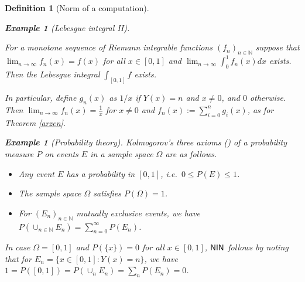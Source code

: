 \documentclass[reqno]{amsart}
\newtheorem{defi}[thm]{Definition}
\newtheorem{exa}[thm]{Example}
\def\N{{\mathbb  N}}
\def\di{\rightarrow}
\def\NIN{\textup{\textsf{NIN}}}
\numberwithin{equation}{section}
\numberwithin{thm}{section}
\begin{document}
\begin{defi}[Norm of a computation]
\begin{exa}[Lebesgue integral II]
\begin{center}
\emph{For a monotone sequence of Riemann integrable functions $(f_{n})_{n\in \N}$ suppose that $\lim_{n\di \infty}f_{n}(x)=f(x)$ for all $x\in [0,1]$ and $\lim_{n\di \infty} \int_{0}^{1}f_{n}(x)dx$ exists.  Then the Lebesgue integral $\int_{[0,1]}f$ exists.}
\end{center}
In particular, define $g_{n}(x)$ as $1/x$ if $Y(x)=n$ and $x\ne 0$, and $0$ otherwise.  Then $\lim_{n\di \infty} f_{n}(x)=\frac{1}{x}$ for $x\ne 0$ and $f_{n}(x):=\sum_{i=0}^{n}g_{i}(x)$, as for Theorem \ref{arzen}.
\end{exa}
\begin{exa}[Probability theory]\rm
Kolmogorov's three axioms (\cite{kolliek}) of a probability measure $P$ on events $E$ in a sample space $\Omega$ are as follows.
\begin{itemize} 
\item Any event $E$ has a probability in $[0,1]$, i.e.\ $0\leq P(E)\leq 1$.
\item The sample space $\Omega$ satisfies $P(\Omega)=1$. 
\item For $(E_{n})_{n\in \N}$ mutually exclusive events, we have $P(\cup_{n\in \N}E_{n})=\sum_{n=0}^{\infty}P(E_{n})$.
\end{itemize}
In case $\Omega=[0,1]$ and $P(\{x\})=0$ for all $x\in [0,1]$, $\NIN$ follows by noting that for $E_{n}=\{x\in [0,1]:Y(x)=n\}$, we have $1=P([0,1])=P(\cup_{n}E_{n})=\sum_{n}P(E_{n})=0$.
\end{exa}


\end{defi}
\end{document}
